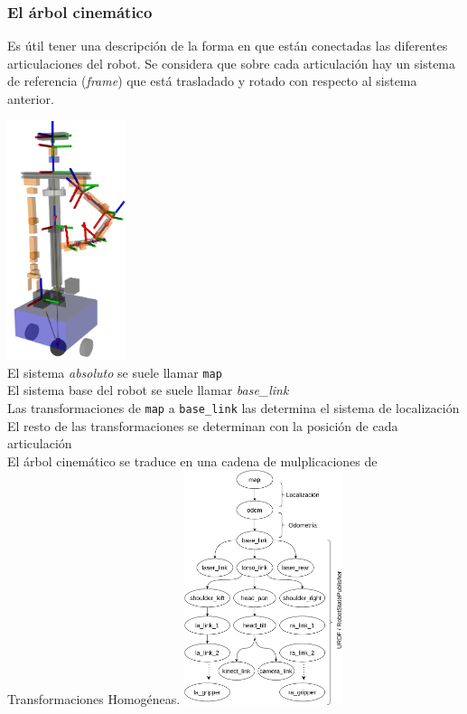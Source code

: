 \begin{frame}\frametitle{El árbol cinemático}
  Es útil tener una descripción de la forma en que están conectadas las diferentes articulaciones del robot. Se considera que sobre cada articulación hay un sistema de referencia (\textit{frame}) que está trasladado y rotado con respecto al sistema anterior.
  \begin{multicols}{3}
    \includegraphics[width=0.26\textwidth]{Figures/KinematicTree.png}\\
    \footnotesize
    El sistema \textit{absoluto} se suele llamar \texttt{map}\\
    El sistema base del robot se suele llamar \textit{base\_link}\\
    Las transformaciones de \texttt{map} a \texttt{base\_link} las determina el sistema de localización\\
    El resto de las transformaciones se determinan con la posición de cada articulación\\
    El árbol cinemático se traduce en una cadena de mulplicaciones de Transformaciones Homogéneas. 
    \includegraphics[width=0.35\textwidth]{Figures/TfTree.pdf}
  \end{multicols}
\end{frame}

